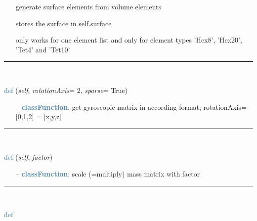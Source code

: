 \begin{itemize}[leftmargin=1.4cm]
\begin{itemize}[leftmargin=1.4cm]
\begin{itemize}[leftmargin=0.5cm]
\begin{itemize}[leftmargin=1.4cm]
\begin{itemize}[leftmargin=1.4cm]
\begin{itemize}[leftmargin=0.5cm]
\begin{itemize}[leftmargin=0.7cm]
  \begin{itemize}[leftmargin=1.2cm]
\setlength{\itemindent}{-0.7cm}
    \item[] generate surface elements from volume elements
    \item[] stores the surface in self.surface
    \item[] only works for one element list and only for element types 'Hex8', 'Hex20', 'Tet4' and 'Tet10'
  \end{itemize}
\vspace{12pt}\end{itemize}
%
\noindent\rule{8cm}{0.75pt}\vspace{1pt} \\ 
\begin{flushleft}
\noindent \textcolor{steelblue}{def {\bf {}}}\label{sec:FEM:FEMinterface:GetGyroscopicMatrix}
({\it self}, {\it rotationAxis}= 2, {\it sparse}= True)
\end{flushleft}
\setlength{\itemindent}{0.7cm}
\begin{itemize}[leftmargin=0.7cm]
  \item[--]  \textcolor{steelblue}{\bf classFunction}: get gyroscopic matrix in according format; rotationAxis=[0,1,2] = [x,y,z]\vspace{12pt}\end{itemize}
%
\noindent\rule{8cm}{0.75pt}\vspace{1pt} \\ 
\begin{flushleft}
\noindent \textcolor{steelblue}{def {\bf {}}}\label{sec:FEM:FEMinterface:ScaleMassMatrix}
({\it self}, {\it factor})
\end{flushleft}
\setlength{\itemindent}{0.7cm}
\begin{itemize}[leftmargin=0.7cm]
  \item[--]  \textcolor{steelblue}{\bf classFunction}: scale (=multiply) mass matrix with factor\vspace{12pt}\end{itemize}
%
\noindent\rule{8cm}{0.75pt}\vspace{1pt} \\ 
\begin{flushleft}
\noindent \textcolor{steelblue}{def {\bf {}}}\label{sec:FEM:FEMinterface:ScaleStiffnessMatrix}

\end{flushleft}
\end{itemize}
\end{itemize}
\end{itemize}
\end{itemize}
\end{itemize}
\end{itemize}
